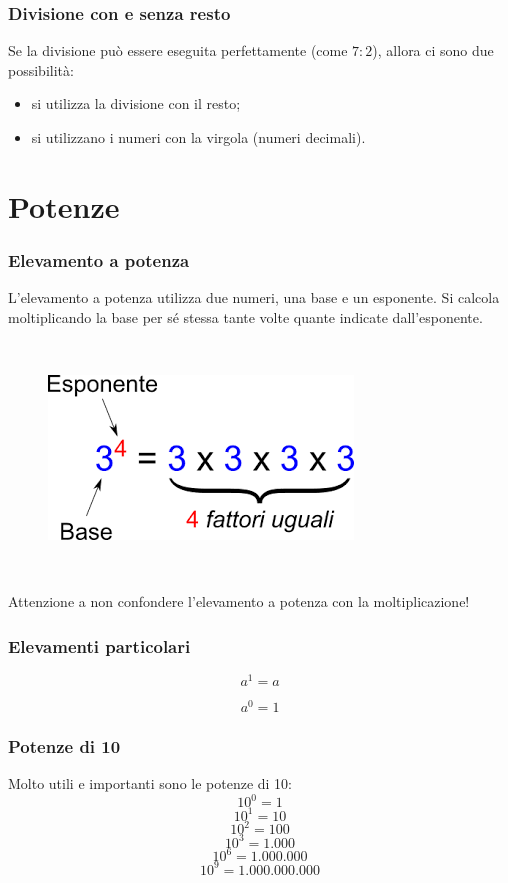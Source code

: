 \documentclass[handout]{beamer}
\theoremstyle{plain}
\begin{document}
\begin{frame}
\frametitle{Divisione con e senza resto}
Se la divisione può essere eseguita perfettamente (come $ 7:2 $), allora ci sono due possibilità:
\begin{itemize}
  \item si utilizza la divisione con il resto;\pause
  \item si utilizzano i numeri con la virgola (numeri decimali).
\end{itemize}
\end{frame}

\section{Potenze}

\begin{frame}
\frametitle{Elevamento a potenza}
L'elevamento a potenza utilizza due numeri, una \alert{base} e un \alert{esponente}. Si calcola moltiplicando la base per sé stessa tante volte quante indicate dall'esponente.

~

\begin{figure}
  \includegraphics[width=.4\columnwidth]{img/potenza2.png}
\end{figure}\pause

~

Attenzione a non confondere l'elevamento a potenza con la moltiplicazione!
\end{frame}


\begin{frame}
\frametitle{Elevamenti particolari}
\[a^1 = a \]

\[ a^0 = 1\]
\end{frame}

\begin{frame}
\frametitle{Potenze di 10}
Molto utili e importanti sono le potenze di 10:
\[10^0 = 1\]\pause
\[10^1 = 10\]\pause
\[10^2 = 100\]\pause
\[10^3 = 1.000\]\pause
\[10^6 = 1.000.000\]\pause
\[10^9 = 1.000.000.000\]\pause
\end{frame}
\end{document}
